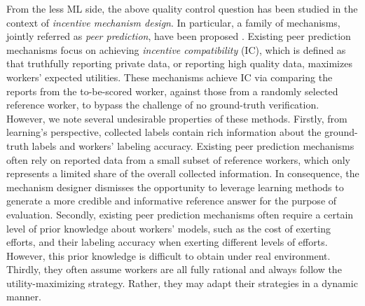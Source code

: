 \documentclass{article}
\newcommand{\com}[1]{\textbf{\color{red}(COMMENT: #1)}} %
\newcommand{\com}[1]{}
\begin{document}
From the less ML side, the above quality control question has been studied in the context of \emph{incentive mechanism design}. In particular, a family of mechanisms, jointly referred as \emph{peer prediction}, have been proposed %
\cite{prelec2004bayesian,jurca2009mechanisms,witkowski2012peer,dasgupta2013crowdsourced}. Existing peer prediction mechanisms focus on achieving \emph{incentive compatibility} (IC), which is defined as that truthfully reporting private data, or reporting high quality data, maximizes workers' expected utilities. These mechanisms achieve IC via comparing the reports from the to-be-scored worker, against those from a randomly selected reference worker, to bypass the challenge of no ground-truth verification.
However, we note several undesirable properties of these methods.
Firstly, from learning's perspective, collected labels contain rich information about the ground-truth labels and workers' labeling accuracy.
Existing peer prediction mechanisms
often rely on reported data from a small subset of reference workers, which only represents a limited share of the overall collected information. In consequence, the mechanism designer dismisses the opportunity to leverage learning methods to generate a more credible and informative reference answer for the purpose of evaluation.
Secondly, existing peer prediction mechanisms often require a certain level of prior knowledge about workers' models, such as the cost of exerting efforts, and their labeling accuracy when exerting different levels of efforts. However, this prior knowledge is difficult to obtain under real environment. Thirdly, they often assume workers are all fully rational and always follow the utility-maximizing strategy. Rather, they may adapt their strategies in a dynamic manner.


\end{document}
